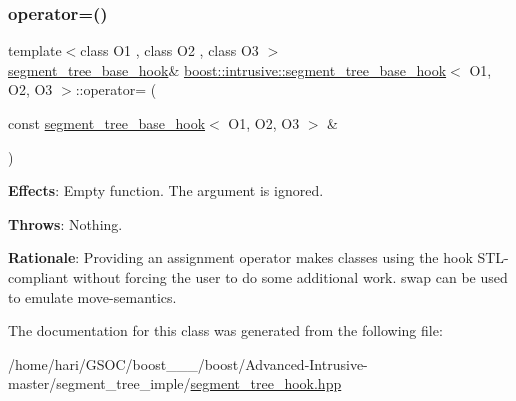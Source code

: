\subsubsection{\texorpdfstring{operator=()}{operator=()}}
{\footnotesize\ttfamily template$<$class O1 , class O2 , class O3 $>$ \\
\hyperlink{classboost_1_1intrusive_1_1segment__tree__base__hook}{segment\+\_\+tree\+\_\+base\+\_\+hook}\& \hyperlink{classboost_1_1intrusive_1_1segment__tree__base__hook}{boost\+::intrusive\+::segment\+\_\+tree\+\_\+base\+\_\+hook}$<$ O1, O2, O3 $>$\+::operator= (\begin{DoxyParamCaption}\item[{const \hyperlink{classboost_1_1intrusive_1_1segment__tree__base__hook}{segment\+\_\+tree\+\_\+base\+\_\+hook}$<$ O1, O2, O3 $>$ \&}]{ }\end{DoxyParamCaption})}

{\bfseries Effects}\+: Empty function. The argument is ignored.

{\bfseries Throws}\+: Nothing.

{\bfseries Rationale}\+: Providing an assignment operator makes classes using the hook S\+T\+L-\/compliant without forcing the user to do some additional work. {\ttfamily swap} can be used to emulate move-\/semantics. 

The documentation for this class was generated from the following file\+:\begin{DoxyCompactItemize}
\item 
/home/hari/\+G\+S\+O\+C/boost\+\_\+\_\+\_/boost/\+Advanced-\/\+Intrusive-\/master/segment\+\_\+tree\+\_\+imple/\hyperlink{segment__tree__hook_8hpp}{segment\+\_\+tree\+\_\+hook.\+hpp}\end{DoxyCompactItemize}
